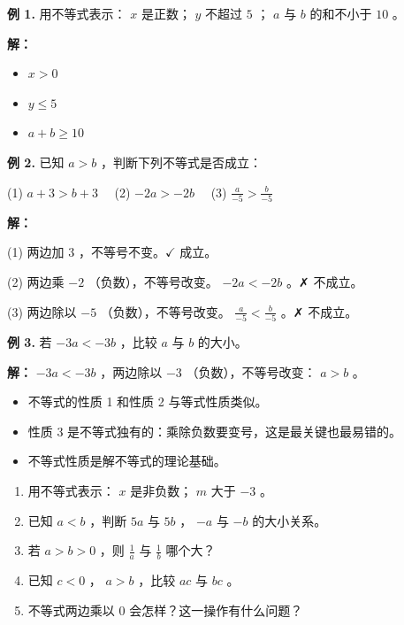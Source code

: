 \begin{workedexamples}


\textbf{例 1.} 用不等式表示： $x$ 是正数； $y$ 不超过 $5$ ； $a$ 与 $b$ 的和不小于 $10$ 。

\textbf{解：}

\begin{itemize}
  \item $x > 0$
  \item $y \leq 5$
  \item $a + b \geq 10$
\end{itemize}


\textbf{例 2.} 已知 $a > b$ ，判断下列不等式是否成立：

(1) $a + 3 > b + 3$ 　(2) $-2a > -2b$ 　(3) $\frac{a}{-5} > \frac{b}{-5}$

\textbf{解：}

(1) 两边加 $3$ ，不等号不变。$\checkmark$ 成立。

(2) 两边乘 $-2$ （负数），不等号改变。 $-2a < -2b$ 。✗ 不成立。

(3) 两边除以 $-5$ （负数），不等号改变。 $\frac{a}{-5} < \frac{b}{-5}$ 。✗ 不成立。

\textbf{例 3.} 若 $-3a < -3b$ ，比较 $a$ 与 $b$ 的大小。

\textbf{解：} $-3a < -3b$ ，两边除以 $-3$ （负数），不等号改变： $a > b$ 。

\end{workedexamples}

\begin{keytakeaway}


\begin{itemize}
  \item 不等式的性质 1 和性质 2 与等式性质类似。
  \item 性质 3 是不等式独有的：乘除负数要变号，这是最关键也最易错的。
  \item 不等式性质是解不等式的理论基础。
\end{itemize}


\end{keytakeaway}

\begin{practice}


\begin{enumerate}
  \item 用不等式表示： $x$ 是非负数； $m$ 大于 $-3$ 。
  \item 已知 $a < b$ ，判断 $5a$ 与 $5b$ ， $-a$ 与 $-b$ 的大小关系。
  \item 若 $a > b > 0$ ，则 $\frac{1}{a}$ 与 $\frac{1}{b}$ 哪个大？
  \item 已知 $c < 0$ ， $a > b$ ，比较 $ac$ 与 $bc$ 。
  \item 不等式两边乘以 $0$ 会怎样？这一操作有什么问题？
\end{enumerate}


\end{practice}

